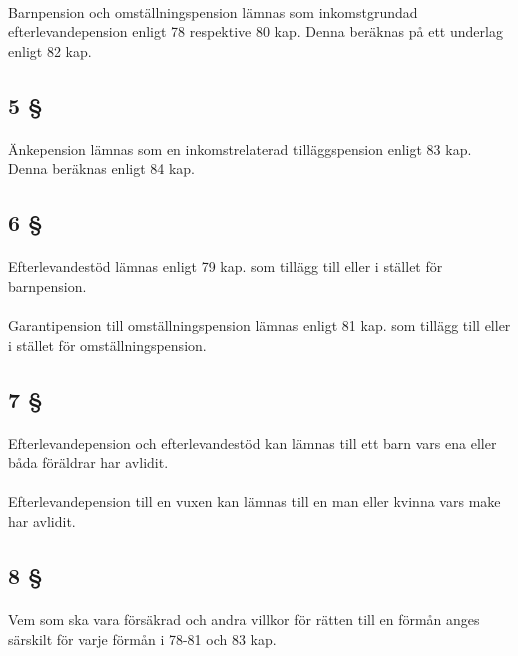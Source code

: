 \documentclass[a4paper,notitlepage,openany,10pt]{book}
\begin{document}
\paragraph*{}
Barnpension och omställningspension lämnas som inkomstgrundad efterlevandepension enligt 78 respektive 80 kap. Denna beräknas på ett underlag enligt 82 kap.
\subsection*{5 §}
\paragraph*{}
Änkepension lämnas som en inkomstrelaterad tilläggspension enligt 83 kap. Denna beräknas enligt 84 kap.
\subsection*{6 §}
\paragraph*{}
Efterlevandestöd lämnas enligt 79 kap. som tillägg till eller i stället för barnpension.
\paragraph*{}
Garantipension till omställningspension lämnas enligt 81 kap.
som tillägg till eller i stället för omställningspension.
\subsection*{7 §}
\paragraph*{}
Efterlevandepension och efterlevandestöd kan lämnas till ett barn vars ena eller båda föräldrar har avlidit.
\paragraph*{}
Efterlevandepension till en vuxen kan lämnas till en man eller kvinna vars make har avlidit.
\subsection*{8 §}
\paragraph*{}
Vem som ska vara försäkrad och andra villkor för rätten till en förmån anges särskilt för varje förmån i 78-81 och 83 kap.
\end{document}
